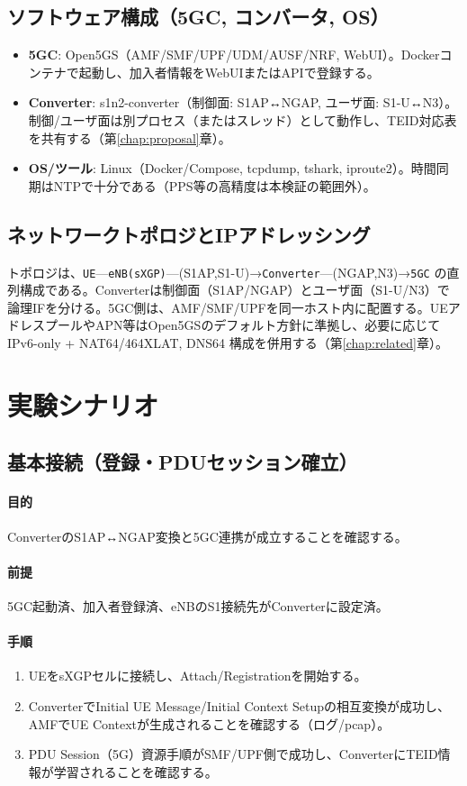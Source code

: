 \subsection{ソフトウェア構成（5GC, コンバータ, OS）}
\begin{itemize}
	\item \textbf{5GC}: Open5GS（AMF/SMF/UPF/UDM/AUSF/NRF, WebUI）。Dockerコンテナで起動し、加入者情報をWebUIまたはAPIで登録する\cite{open5gs}。
	\item \textbf{Converter}: s1n2-converter（制御面: S1AP↔NGAP, ユーザ面: S1-U↔N3）。制御/ユーザ面は別プロセス（またはスレッド）として動作し、TEID対応表を共有する（第\ref{chap:proposal}章）。
	\item \textbf{OS/ツール}: Linux（Docker/Compose, tcpdump, tshark, iproute2）。時間同期はNTPで十分である（PPS等の高精度は本検証の範囲外）。
\end{itemize}

\subsection{ネットワークトポロジとIPアドレッシング}
トポロジは、\texttt{UE}—\texttt{eNB(sXGP)}—(S1AP,S1-U)→\texttt{Converter}—(NGAP,N3)→\texttt{5GC} の直列構成である。Converterは制御面（S1AP/NGAP）とユーザ面（S1-U/N3）で論理IFを分ける。5GC側は、AMF/SMF/UPFを同一ホスト内に配置する。UEアドレスプールやAPN等はOpen5GSのデフォルト方針に準拠し、必要に応じてIPv6-only + NAT64/464XLAT, DNS64 構成を併用する（第\ref{chap:related}章）。

\section{実験シナリオ}
\subsection{基本接続（登録・PDUセッション確立）}
\paragraph{目的} ConverterのS1AP↔NGAP変換と5GC連携が成立することを確認する。
\paragraph{前提} 5GC起動済、加入者登録済、eNBのS1接続先がConverterに設定済。
\paragraph{手順}
\begin{enumerate}
	\item UEをsXGPセルに接続し、Attach/Registrationを開始する。
	\item ConverterでInitial UE Message/Initial Context Setupの相互変換が成功し、AMFでUE Contextが生成されることを確認する（ログ/pcap）。
	\item PDU Session（5G）資源手順がSMF/UPF側で成功し、ConverterにTEID情報が学習されることを確認する。
\end{enumerate}
